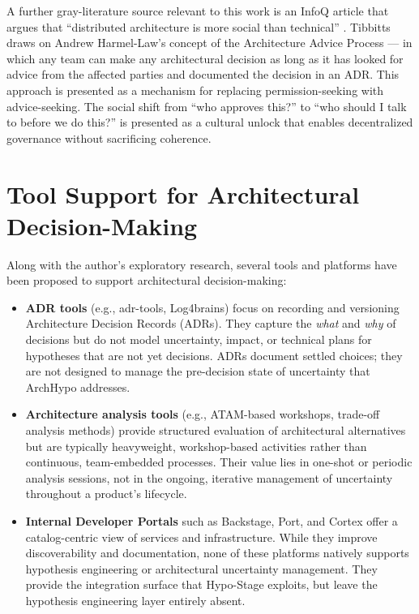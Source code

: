 A further gray-literature source relevant to this work is an InfoQ article that argues that ``distributed architecture is
more social than technical'' \citep{infoq2025decentralized}. Tibbitts draws on Andrew Harmel-Law's concept of the
Architecture Advice Process --- in which any team can make
any architectural decision as long as it has looked for advice from the affected parties and
documented the decision in an ADR. This approach is presented as a mechanism for replacing permission-seeking
with advice-seeking. The social shift from ``who approves this?'' to ``who should I talk
to before we do this?'' is presented as a cultural unlock that enables decentralized
governance without sacrificing coherence.

\section{Tool Support for Architectural Decision-Making}
\label{sec:tool-support}

Along with the author's exploratory research, several tools and platforms have been proposed to support architectural decision-making:

\begin{itemize}
  \item \textbf{ADR tools} (e.g., adr-tools, Log4brains) focus on recording and
  versioning Architecture Decision Records (ADRs). They capture the \emph{what} and
  \emph{why} of decisions but do not model uncertainty, impact, or technical plans for
  hypotheses that are not yet decisions. ADRs document settled choices; they are not
  designed to manage the pre-decision state of uncertainty that ArchHypo addresses.

  \item \textbf{Architecture analysis tools} (e.g., ATAM-based workshops, trade-off
  analysis methods) provide structured evaluation of architectural alternatives but are
  typically heavyweight, workshop-based activities rather than continuous,
  team-embedded processes. Their value lies in one-shot or periodic analysis sessions,
  not in the ongoing, iterative management of uncertainty throughout a product's
  lifecycle.

  \item \textbf{Internal Developer Portals} such as Backstage, Port, and Cortex offer
  a catalog-centric view of services and infrastructure. While they improve
  discoverability and documentation, none of these platforms natively supports
  hypothesis engineering or architectural uncertainty management. They provide the
  integration surface that Hypo-Stage exploits, but leave the hypothesis engineering
  layer entirely absent.
\end{itemize}

